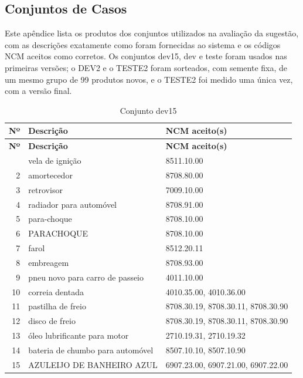 \begin{apendicesenv}

\chapter{Conjuntos de Casos}
\label{ap:conjuntos}

Este apêndice lista os produtos dos conjuntos utilizados na avaliação da sugestão, com as descrições exatamente como foram fornecidas ao sistema e os códigos NCM aceitos como corretos. Os conjuntos dev15, dev e teste foram usados nas primeiras versões; o DEV2 e o TESTE2 foram sorteados, com semente fixa, de um mesmo grupo de 99 produtos novos, e o TESTE2 foi medido uma única vez, com a versão final.

\begin{center}
\small
\begin{longtable}{r p{7.6cm} p{6.4cm}}
\caption{Conjunto dev15}\label{tab:ap_dev15} \\
\hline
\textbf{Nº} & \textbf{Descrição} & \textbf{NCM aceito(s)} \\
\hline
\endfirsthead
\hline
\textbf{Nº} & \textbf{Descrição} & \textbf{NCM aceito(s)} \\
\hline
\endhead
\hline
\endfoot
1 & vela de ignição & 8511.10.00 \\
2 & amortecedor & 8708.80.00 \\
3 & retrovisor & 7009.10.00 \\
4 & radiador para automóvel & 8708.91.00 \\
5 & para-choque & 8708.10.00 \\
6 & PARACHOQUE & 8708.10.00 \\
7 & farol & 8512.20.11 \\
8 & embreagem & 8708.93.00 \\
9 & pneu novo para carro de passeio & 4011.10.00 \\
10 & correia dentada & 4010.35.00, 4010.36.00 \\
11 & pastilha de freio & 8708.30.19, 8708.30.11, 8708.30.90 \\
12 & disco de freio & 8708.30.19, 8708.30.11, 8708.30.90 \\
13 & óleo lubrificante para motor & 2710.19.31, 2710.19.32 \\
14 & bateria de chumbo para automóvel & 8507.10.10, 8507.10.90 \\
15 & AZULEIJO DE BANHEIRO AZUL & 6907.23.00, 6907.21.00, 6907.22.00 \\
\end{longtable}
\end{center}


\end{apendicesenv}
